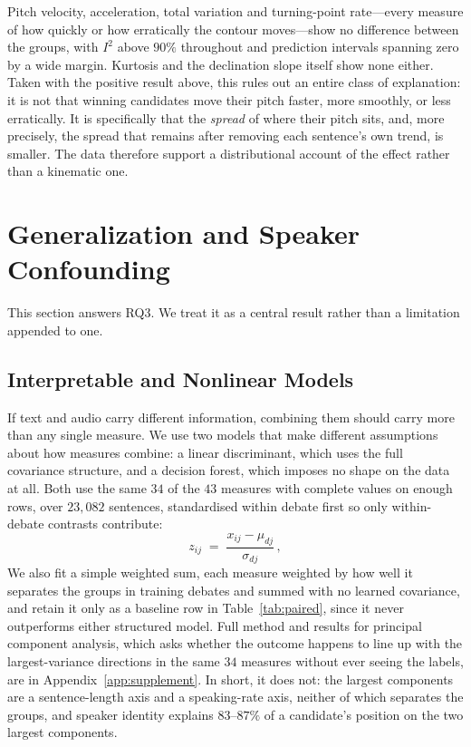 \documentclass[journal]{IEEEtran}
\begin{document}
Pitch velocity, acceleration, total variation and turning-point rate---every
measure of how quickly or how erratically the contour moves---show no
difference between the groups, with $I^2$ above $90\%$ throughout and
prediction intervals spanning zero by a wide margin. Kurtosis and the
declination slope itself show none either. Taken with the positive result
above, this rules out an entire class of explanation: it is not that
winning candidates move their pitch faster, more smoothly, or less
erratically. It is specifically that the \emph{spread} of where their pitch
sits, and, more precisely, the spread that remains after removing each
sentence's own trend, is smaller. The data therefore support a
distributional account of the effect rather than a kinematic one.

\section{Generalization and Speaker Confounding}
\label{sec:method:generalise}

This section answers RQ3. We treat it as a central result rather than a
limitation appended to one.

\subsection{Interpretable and Nonlinear Models}
\label{sec:method:combined}

If text and audio carry different information, combining them should carry
more than any single measure. We use two models that make different
assumptions about how measures combine: a linear discriminant, which uses
the full covariance structure, and a decision forest, which imposes no shape
on the data at all. Both use the same $34$ of the $43$ measures with
complete values on enough rows, over $23{,}082$ sentences, standardised
within debate first so only within-debate contrasts contribute:
\begin{equation}
z_{ij} \;=\; \frac{x_{ij} - \mu_{dj}}{\sigma_{dj}} \,,
\label{eq:zscore}
\end{equation}
We also fit a simple weighted sum, each measure weighted by how well it
separates the groups in training debates and summed with no learned
covariance, and retain it only as a baseline row in Table~\ref{tab:paired},
since it never outperforms either structured model. Full method and results
for principal component analysis, which asks whether the outcome happens to
line up with the largest-variance directions in the same $34$ measures
without ever seeing the labels, are in Appendix~\ref{app:supplement}. In
short, it does not: the largest components are a sentence-length axis and a
speaking-rate axis, neither of which separates the groups, and speaker
identity explains $83$--$87\%$ of a candidate's position on the two largest
components.
\end{document}

